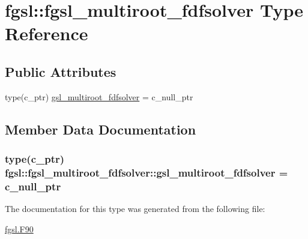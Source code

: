 \hypertarget{structfgsl_1_1fgsl__multiroot__fdfsolver}{\section{fgsl\-:\-:fgsl\-\_\-multiroot\-\_\-fdfsolver Type Reference}
\label{structfgsl_1_1fgsl__multiroot__fdfsolver}
}
\subsection*{Public Attributes}
\begin{DoxyCompactItemize}
\item 
type(c\-\_\-ptr) \hyperlink{structfgsl_1_1fgsl__multiroot__fdfsolver_a071c869b109e79b914893dc43705ee66}{gsl\-\_\-multiroot\-\_\-fdfsolver} = c\-\_\-null\-\_\-ptr
\end{DoxyCompactItemize}


\subsection{Member Data Documentation}
\hypertarget{structfgsl_1_1fgsl__multiroot__fdfsolver_a071c869b109e79b914893dc43705ee66}{
\subsubsection[{gsl\-\_\-multiroot\-\_\-fdfsolver}]{\setlength{\rightskip}{0pt plus 5cm}type(c\-\_\-ptr) fgsl\-::fgsl\-\_\-multiroot\-\_\-fdfsolver\-::gsl\-\_\-multiroot\-\_\-fdfsolver = c\-\_\-null\-\_\-ptr}}\label{structfgsl_1_1fgsl__multiroot__fdfsolver_a071c869b109e79b914893dc43705ee66}


The documentation for this type was generated from the following file\-:\begin{DoxyCompactItemize}
\item 
\hyperlink{fgsl_8F90}{fgsl.\-F90}\end{DoxyCompactItemize}
